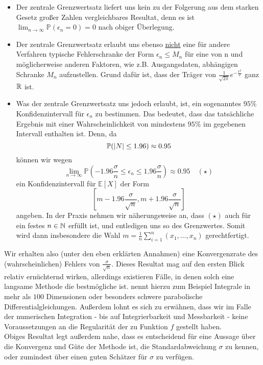 	 \begin{itemize}
	 	\item Der zentrale Grenzwertsatz liefert uns kein zu der Folgerung aus dem starken Gesetz großer Zahlen vergleichbares Resultat, denn es ist  $ \lim_{n \to \infty} \mathbb{P}(\epsilon_n = 0) = 0 $ nach obiger Überlegung.
	 	\item Der zentrale Grenzwertsatz erlaubt uns ebenso \underline{nicht} eine für andere Verfahren typische Fehlerschranke der Form $ \epsilon_n \leq M_n $ für eine von n und möglicherweise anderen Faktoren, wie z.B. Ausgangsdaten, abhängigen Schranke $ M_n $ aufzustellen. Grund dafür ist, dass der Träger von $\frac{1}{\sqrt{2\pi}}e^{-\frac{x^2}{2}}$ ganz $ \mathbb{R} $ ist.
	 	\item Was der zentrale Grenzwertsatz uns jedoch erlaubt, ist, ein sogenanntes $ 95\% $ Konfidenzintervall für $ \epsilon_n $ zu bestimmen. Das bedeutet, dass das tatsächliche Ergebnis mit einer Wahrscheinlichkeit von mindestens $ 95 \% $ im gegebenen Intervall enthalten ist. Denn, da 
	 	\[
	 		\mathbb{P}(| N | \leq 1.96) \approx 0.95
	 	\]
	 	können wir wegen
	 	\[
	 		\lim\limits_{n\to\infty}\mathbb{P}(-1.96\frac{\sigma}{n}\leq \epsilon_n \leq 1.96\frac{\sigma}{n}) \approx 0.95 \quad (\star)
	 	\]
	 	ein Konfidenzintervall für $ \mathbb{E}[X] $ der Form
	 	\[
	 		[m-1.96\frac{\sigma}{\sqrt{n}},m+1.96\frac{\sigma}{\sqrt{n}}]
	 	\]
	 	angeben. In der Praxis nehmen wir näherungsweise an, dass $ (\star) $ auch für ein festes $ n \in \mathbb{N} $ erfüllt ist, und entledigen uns so des Grenzwertes. Somit wird dann insbesondere die Wahl $ m = \frac{1}{n}\sum_{i=1}^{n}(x_1,\dots,x_n) $ gerechtfertigt.
	 \end{itemize}
 	Wir erhalten also (unter den eben erklärten Annahmen) eine Konvergenzrate des (wahrscheinlichen) Fehlers von $ \frac{\sigma}{\sqrt{n}} $. Dieses Resultat mag auf den ersten Blick relativ ernüchternd wirken, allerdings existieren Fälle, in denen solch eine langsame Methode die bestmögliche ist. \cite{lapeyre2003introduction} nennt hierzu zum Beispiel Integrale in mehr als $ 100 $ Dimensionen oder besonders schwere parabolische Differentialgleichungen. Außerdem lohnt es sich zu erwähnen, dass wir im Falle der numerischen Integration - bis auf Integrierbarkeit und Messbarkeit - keine Voraussetzungen an die Regularität der zu Funktion $ f $ gestellt haben.\\
 	Obiges Resultat legt außerdem nahe, dass es entscheidend für eine Aussage über die Konvergenz und Güte der Methode ist, die Standardabweichung $ \sigma $ zu kennen, oder zumindest über einen guten Schätzer für $ \sigma $ zu verfügen.
